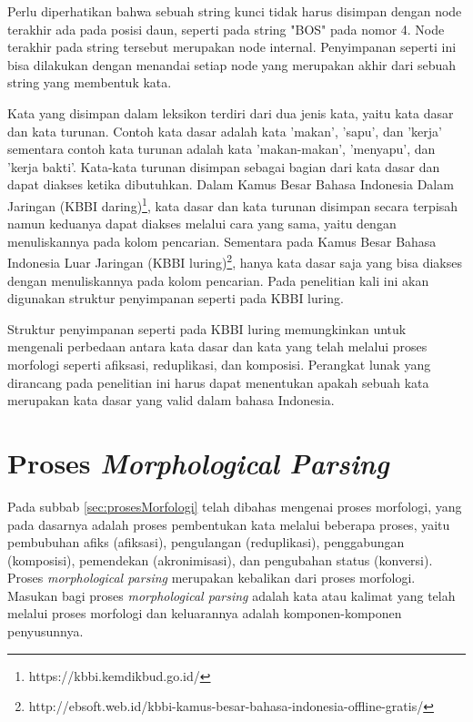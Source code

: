 Perlu diperhatikan bahwa sebuah string kunci tidak harus disimpan dengan node terakhir ada pada posisi daun, seperti pada string "BOS" pada nomor 4. Node terakhir pada string tersebut merupakan node internal. Penyimpanan seperti ini bisa dilakukan dengan menandai setiap node yang merupakan akhir dari sebuah string yang membentuk kata.

Kata yang disimpan dalam leksikon terdiri dari dua jenis kata, yaitu kata dasar dan kata turunan. Contoh kata dasar adalah kata 'makan', 'sapu', dan 'kerja' sementara contoh kata turunan adalah kata 'makan-makan', 'menyapu', dan 'kerja bakti'. Kata-kata turunan disimpan sebagai bagian dari kata dasar dan dapat diakses ketika dibutuhkan. Dalam Kamus Besar Bahasa Indonesia Dalam Jaringan (KBBI daring)\footnote{https://kbbi.kemdikbud.go.id/}, kata dasar dan kata turunan disimpan secara terpisah namun keduanya dapat diakses melalui cara yang sama, yaitu dengan menuliskannya pada kolom pencarian. Sementara pada Kamus Besar Bahasa Indonesia Luar Jaringan (KBBI luring)\footnote{http://ebsoft.web.id/kbbi-kamus-besar-bahasa-indonesia-offline-gratis/}, hanya kata dasar saja yang bisa diakses dengan menuliskannya pada kolom pencarian. Pada penelitian kali ini akan digunakan struktur penyimpanan seperti pada KBBI luring.

Struktur penyimpanan seperti pada KBBI luring memungkinkan untuk mengenali perbedaan antara kata dasar dan kata yang telah melalui proses morfologi seperti afiksasi, reduplikasi, dan komposisi. Perangkat lunak yang dirancang pada penelitian ini harus dapat menentukan apakah sebuah kata merupakan kata dasar yang valid dalam bahasa Indonesia.


\section{Proses \textit{Morphological Parsing}}
\label{sec:morphologicalParsing}

Pada subbab \ref{sec:prosesMorfologi} telah dibahas mengenai proses morfologi, yang pada dasarnya adalah proses pembentukan kata melalui beberapa proses, yaitu pembubuhan afiks (afiksasi), pengulangan (reduplikasi), penggabungan (komposisi), pemendekan (akronimisasi), dan pengubahan status (konversi). Proses \textit{morphological parsing} merupakan kebalikan dari proses morfologi. Masukan bagi proses \textit{morphological parsing} adalah kata atau kalimat yang telah melalui proses morfologi dan keluarannya adalah komponen-komponen penyusunnya.

